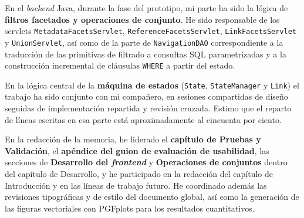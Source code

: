 En el \textit{backend} Java, durante la fase del prototipo, mi parte ha sido la lógica de
\textbf{filtros facetados y operaciones de conjunto}. He sido responsable de los servlets
\texttt{MetadataFacetsServlet}, \texttt{ReferenceFacetsServlet}, \texttt{LinkFacetsServlet} y
\texttt{UnionServlet}, así como de la parte de \texttt{NavigationDAO} correspondiente a la
traducción de las primitivas de filtrado a consultas SQL parametrizadas y a la construcción
incremental de cláusulas \texttt{WHERE} a partir del estado.

En la lógica central de la \textbf{máquina de estados} (\texttt{State}, \texttt{StateManager}
y \texttt{Link}) el trabajo ha sido conjunto con mi compañero, en sesiones compartidas de
diseño seguidas de implementación repartida y revisión cruzada. Estimo que el reparto de líneas
escritas en esa parte está aproximadamente al cincuenta por ciento.

En la redacción de la memoria, he liderado el \textbf{capítulo de Pruebas y Validación}, el
\textbf{apéndice del guion de evaluación de usabilidad}, las secciones de \textbf{Desarrollo
del \textit{frontend}} y \textbf{Operaciones de conjuntos} dentro del capítulo de Desarrollo, y he
participado en la redacción del capítulo de Introducción y en las líneas de trabajo futuro.
He coordinado además las revisiones tipográficas y de estilo del documento global, así como la
generación de las figuras vectoriales con PGFplots para los resultados cuantitativos.
